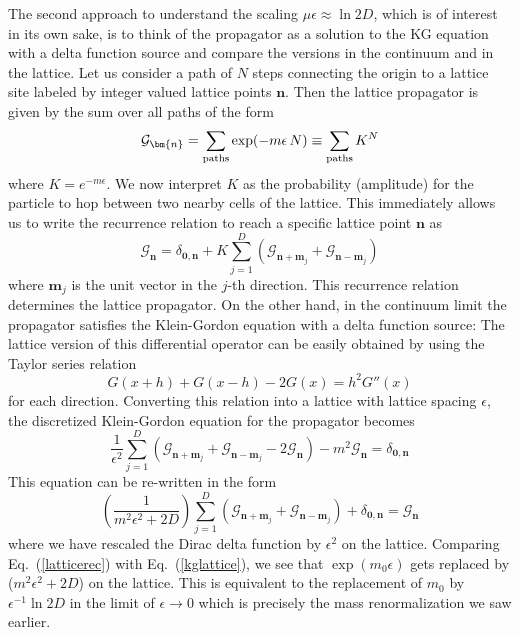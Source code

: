 \documentclass{article}
\def\eq#1{{Eq.~(\ref{#1})}}
\begin{document}
The second approach to understand the scaling $\mu\epsilon \approx \ln 2D$, which is of interest in its own sake, is to think of the propagator as a solution to the KG equation with a delta function source and compare the versions in the continuum and in the lattice.
 Let us consider a path of $N$ steps connecting the origin to a lattice site labeled by integer valued lattice points $\bm{n}$. Then the lattice propagator is given by the sum over all paths of the form
\begin{equation}
 \mathcal{G}_{\bm{n}} = \sum_{\rm paths} \exp(-m\epsilon \, N) \equiv \sum_{\rm paths} K^N
\end{equation} 
where $K = e^{-m\epsilon }$. We now interpret $K$ as the probability (amplitude) for the particle to hop between two nearby cells of the lattice. This immediately allows us to write the recurrence relation to reach a specific lattice point $\bm{n}$ as
\begin{equation}
 \mathcal{G}_{\bm{n}} = \delta_{\bm{0},\bm{n}} + K\sum_{j=1}^D  (\mathcal{G}_{\bm{n}+\bm{m}_j} + \mathcal{G}_{\bm{n}-\bm{m}_j})
 \label{latticerec}
\end{equation} 
where $\bm{m}_j$ is the unit vector in the $j$-th direction. This recurrence relation determines the lattice propagator. On the other hand, in the continuum limit the propagator satisfies the Klein-Gordon equation with a delta function source:  
The lattice version of this differential operator can be easily obtained by using the Taylor series relation 
\begin{equation}
 G(x+h) + G(x-h) - 2G(x) = h^2 G''(x)
\end{equation} 
for each direction.
Converting this relation into a lattice with lattice spacing $\epsilon$, the discretized Klein-Gordon equation for the propagator becomes
\begin{equation}
 \frac{1}{\epsilon^2} \sum_{j=1}^D  (\mathcal{G}_{\bm{n}+\bm{m}_j} + \mathcal{G}_{\bm{n}-\bm{m}_j} - 2 \mathcal{G}_{\bm{n}}) - m^2 \mathcal{G}_{\bm{n}} = \delta_{\bm{0},\bm{n}}
\end{equation} 
This equation can be re-written in the form
\begin{equation}
 \left( \frac{1}{m^2\epsilon^2 +2D}\right) \sum_{j=1}^D  (\mathcal{G}_{\bm{n}+\bm{m}_j} + \mathcal{G}_{\bm{n}-\bm{m}_j}) + \delta_{\bm{0},\bm{n}} = \mathcal{G}_{\bm{n}}
 \label{kglattice}
\end{equation} 
where we have rescaled the Dirac delta function by $\epsilon^2$ on the lattice. Comparing \eq{latticerec} with \eq{kglattice}, we see that $\exp(m_0 \epsilon)$ gets replaced by ($m^2 \epsilon^2 + 2D$) on the lattice. This is equivalent to the replacement of $m_0$ by $\epsilon^{-1}\ln 2D$ in the limit of $\epsilon \to 0$ which is precisely the mass renormalization we saw earlier. 
\end{document}
